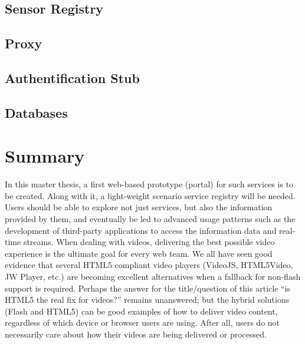 \subsection{Sensor Registry}
\subsection{Proxy}
\subsection{Authentification Stub}
\subsection{Databases}

\section{Summary}
In this master thesis, a first web-based prototype (portal) for such services is to be
created. Along with it, a light-weight scenario service registry will be needed. Users
should be able to explore not just services, but also the information provided by
them, and eventually be led to advanced usage patterns such as the development
of third-party applications to access the information data and real-time streams.
When dealing with videos, delivering the best possible video experience is the ultimate goal for every web team.  We all have seen good evidence that several HTML5 compliant video players (VideoJS, HTML5Video, JW Player, etc.) are becoming excellent alternatives when a fallback for non-flash support is required.  Perhaps the answer for the title/question of this article “is HTML5 the real fix for videos?” remains unanswered; but the hybrid solutions (Flash and HTML5) can be good examples of how to deliver video content, regardless of which device or browser users are using. After all, users do not necessarily care about how their videos are being delivered or processed. 
